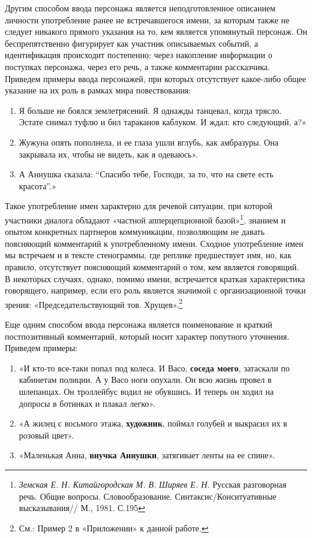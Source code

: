 \documentclass{kursa4}
\begin{document}
        Другим способом ввода персонажа является неподготовленное описанием личности употребление ранее не встречавшегося имени, за которым также не следует никакого прямого указания на то, кем является упомянутый персонаж. Он беспрепятственно фигурирует как участник описываемых событий, а идентификация происходит постепенно: через накопление информации о поступках персонажа, через его речь, а также комментарии рассказчика. Приведем примеры ввода персонажей, при которых отсутствует какое-либо общее указание на их роль в рамках мира повествования: 

        \begin{enumerate}
          \item Я больше не боялся землетрясений. Я однажды танцевал, когда трясло. Эстате снимал туфлю и бил тараканов каблуком. И ждал: кто следующий, а?» \item Жужуна опять пополнела, и ее глаза ушли вглубь, как амбразуры. Она закрывала их, чтобы не видеть, как я одеваюсь». 
          \item А Аннушка сказала: “Спасибо тебе, Господи, за то, что на свете есть красота”.» \end{enumerate}

        Такое употребление имен характерно для речевой ситуации, при которой участники диалога обладают «частной апперцепционной базой»\footnote{\textit{Земская Е. Н. Китайгородская М. В. }\textit{Ширяев Е. Н. }Русская разговорная речь. Общие вопросы. Словообразование. Синтаксис/Конситуативные высказывания// М., 1981. С.195}, знанием и опытом конкретных партнеров коммуникации, позволяющим не давать поясняющий комментарий к употребленному имени. Сходное употребление имен мы встречаем и в тексте стенограммы, где реплике предшествует имя, но, как правило, отсутствует поясняющий комментарий о том, кем является говорящий. В некоторых случаях, однако, помимо имени, встречается краткая характеристика говорящего, например, если его роль является значимой с организационной точки зрения: «Председательствующий тов. Хрущев».\footnote{См.: Пример 2 в «Приложении» к данной работе.} 

        Еще одним способом ввода персонажа является поименование и краткий постпозитивный комментарий, который носит характер попутного уточнения. Приведем примеры: \begin{enumerate}
          \item «И кто-то все-таки попал под колеса. И Васо, \textbf{соседа моего}, затаскали по кабинетам полиции. А у Васо ноги опухали. Он всю жизнь провел в шлепанцах. Он троллейбус водил не обувшись. И теперь он ходил на допросы в ботинках и плакал легко». \item «А жилец с восьмого этажа, \textbf{художник}, поймал голубей и выкрасил их в розовый цвет». \item «Маленькая Анна, \textbf{внучка Аннушки}, затягивает ленты на ее спине». \end{enumerate}
\end{document}
